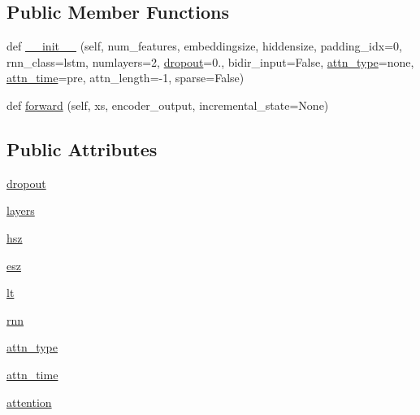 \subsection*{Public Member Functions}
\begin{DoxyCompactItemize}
\item 
def \hyperlink{classparlai_1_1agents_1_1seq2seq_1_1modules_1_1RNNDecoder_ac115797a89d673f99c26d1ed9fba6d30}{\+\_\+\+\_\+init\+\_\+\+\_\+} (self, num\+\_\+features, embeddingsize, hiddensize, padding\+\_\+idx=0, rnn\+\_\+class=\textquotesingle{}lstm\textquotesingle{}, numlayers=2, \hyperlink{classparlai_1_1agents_1_1seq2seq_1_1modules_1_1RNNDecoder_a5d511816f2f290ec64f133b70d07ecba}{dropout}=0., bidir\+\_\+input=False, \hyperlink{classparlai_1_1agents_1_1seq2seq_1_1modules_1_1RNNDecoder_acbc1b2f265124a2fa38e6239753de878}{attn\+\_\+type}=\textquotesingle{}none\textquotesingle{}, \hyperlink{classparlai_1_1agents_1_1seq2seq_1_1modules_1_1RNNDecoder_add11830f4f2f5126896647fe0821a0bc}{attn\+\_\+time}=\textquotesingle{}pre\textquotesingle{}, attn\+\_\+length=-\/1, sparse=False)
\item 
def \hyperlink{classparlai_1_1agents_1_1seq2seq_1_1modules_1_1RNNDecoder_a883315b7f0f57ccf17c96fc8f24ddc11}{forward} (self, xs, encoder\+\_\+output, incremental\+\_\+state=None)
\end{DoxyCompactItemize}
\subsection*{Public Attributes}
\begin{DoxyCompactItemize}
\item 
\hyperlink{classparlai_1_1agents_1_1seq2seq_1_1modules_1_1RNNDecoder_a5d511816f2f290ec64f133b70d07ecba}{dropout}
\item 
\hyperlink{classparlai_1_1agents_1_1seq2seq_1_1modules_1_1RNNDecoder_aa72b03f6c3bf630739d3147b4b2711c4}{layers}
\item 
\hyperlink{classparlai_1_1agents_1_1seq2seq_1_1modules_1_1RNNDecoder_ab4a5f0dcf148831333b89f3f4b2d6045}{hsz}
\item 
\hyperlink{classparlai_1_1agents_1_1seq2seq_1_1modules_1_1RNNDecoder_aa23f87293a0dc476dd4a2c101c3796b2}{esz}
\item 
\hyperlink{classparlai_1_1agents_1_1seq2seq_1_1modules_1_1RNNDecoder_a86a529bada7d11138e31c658b2c10dbb}{lt}
\item 
\hyperlink{classparlai_1_1agents_1_1seq2seq_1_1modules_1_1RNNDecoder_ace209ab9eab09c06a356da8daca8ce3c}{rnn}
\item 
\hyperlink{classparlai_1_1agents_1_1seq2seq_1_1modules_1_1RNNDecoder_acbc1b2f265124a2fa38e6239753de878}{attn\+\_\+type}
\item 
\hyperlink{classparlai_1_1agents_1_1seq2seq_1_1modules_1_1RNNDecoder_add11830f4f2f5126896647fe0821a0bc}{attn\+\_\+time}
\item 
\hyperlink{classparlai_1_1agents_1_1seq2seq_1_1modules_1_1RNNDecoder_a28ca5ae00c8d57bb952a8c4f477da2db}{attention}
\end{DoxyCompactItemize}


